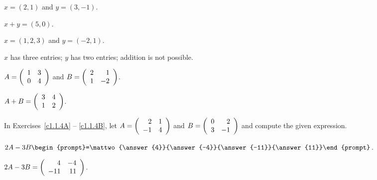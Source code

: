 \documentclass{ximera}
\begin{document}
\begin{exercise}\label{c1.1.3a}
  $x=(2,1)$ and $y=(3,-1)$.
  
\begin{solution}
\ans $x + y = (5,0)$.

\end{solution}
\end{exercise}




\problemlabel

\begin{exercise}\label{c1.1.3c}
  $x=(1,2,3)$ and $y=(-2,1)$.
  

\begin{solution}
\ans $x$ has three entries; $y$ has two entries; addition is not possible.

\end{solution}
\end{exercise}




\problemlabel

\begin{exercise}\label{c1.1.3d}
  $A=\left(\begin{array}{rr} 1 & 3\\ 0 &4\end{array}\right)$ and $B=\left(\begin{array}{rr} 2 & 1\\ 1 &-2\end{array}\right)$.
  
\begin{solution}
\ans $A + B = \left(\begin{array}{rr} 3 & 4\\ 1 &2\end{array}\right)$.

\end{solution}

\begin{solution}


\end{solution}
\end{exercise}




\problemlabel

\noindent In Exercises~\ref{c1.1.4A} -- \ref{c1.1.4B}, let
$A=\left(\begin{array}{rr} 2 & 1\\ -1 &4\end{array}\right)$ and $B=\left(\begin{array}{rr} 0 & 2\\ 3 &-1\end{array}\right)$ and compute the given 
expression.


\begin{exercise}\label{c1.1.4B}
  $2A-3B\begin{prompt}=\mattwo{\answer{4}}{\answer{-4}}{\answer{-11}}{\answer{11}}\end{prompt}$.

\begin{solution}
\ans $2A - 3B = \left(\begin{array}{rr} 4 & -4\\ -11 &11\end{array}\right)$.




\end{solution}
\end{exercise}


\end{document}
